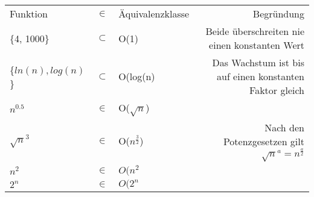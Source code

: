 \begin{tabular}{lcl|r}
Funktion		& $\in $ 	& Äquivalenzklasse & Begründung \\
\{4, 1000\}		& $\subset$ 	& O(1) 			& Beide überschreiten nie einen konstanten Wert \\
\{$ln(n), log(n)$\} 	& $\subset$	& O(log(n)		& Das Wachstum ist bis auf einen konstanten Faktor gleich \\
$n^{0.5}$		& $\in$		& O($\sqrt{n}$)		&	\\
$\sqrt{n}^{3}$		& $\in$		& O($n^{\frac{3}{2}}$)	& Nach den Potenzgesetzen gilt $\sqrt{n}^a = n ^{\frac{a}{2}} $\\
$n^{2}$			& $\in$		& $O(n^2$		& \\ 
$2^{n}$			& $\in$		& $O(2^n$		& \\ 
\end{tabular}


